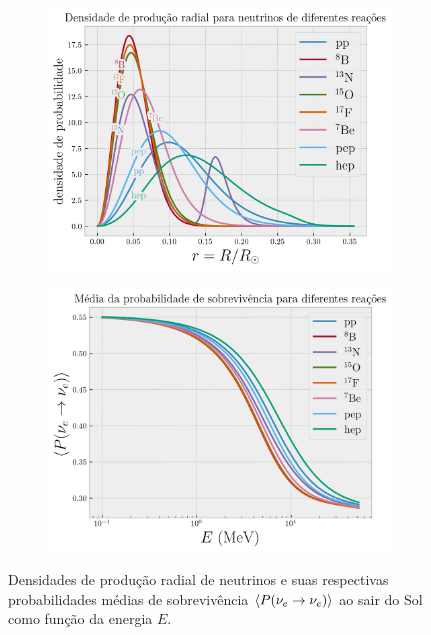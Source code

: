 \documentclass[12pt]{report}
\begin{document}
\begin{figure}[H]
\centering
\begin{subfigure}{.5\textwidth}
  \centering
  \includegraphics[width=\linewidth]{fig/raio.png}
  \caption{}
  \label{fig:raio}
\end{subfigure}%
\begin{subfigure}{.5\textwidth}
  \centering
  \includegraphics[width=\linewidth]{fig/surv_prob.png}
  \caption{}
  \label{fig:surv_prob}
\end{subfigure}
\caption{Densidades de produção radial de neutrinos e suas respectivas probabilidades médias de sobrevivência $\ev{P(\nu_e \to \nu_e)}$ ao sair do Sol como função da energia $E$.}
\label{fig:solar_results}
\end{figure}
\end{document}
